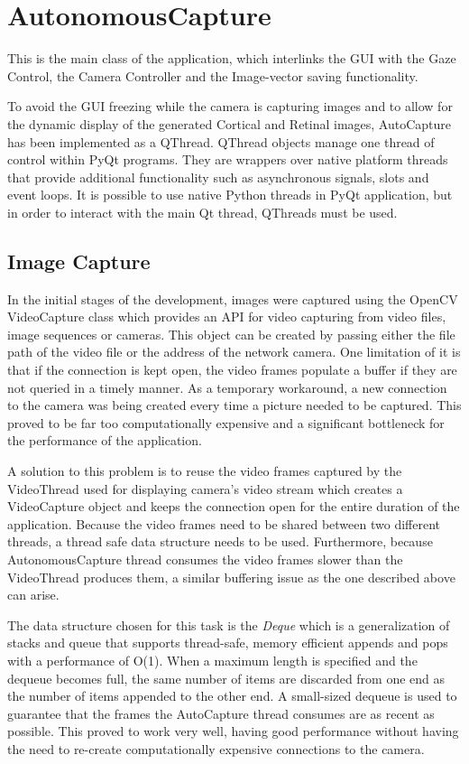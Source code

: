 \documentclass{l4proj}
\begin{document}
\section{AutonomousCapture}

This is the main class of the application, which interlinks the GUI with the Gaze Control, the Camera Controller and the Image-vector saving functionality. 


To avoid the GUI freezing while the camera is capturing images and to allow for the dynamic display of the generated Cortical and Retinal images, AutoCapture has been implemented as a QThread. QThread objects manage one thread of control within PyQt programs. They are wrappers over native platform threads that provide additional functionality such as asynchronous signals, slots and event loops. It is possible to use native Python threads in PyQt application, but in order to interact with the main Qt thread, QThreads must be used.

\subsection{Image Capture}

In the initial stages of the development, images were captured using the OpenCV VideoCapture class which provides an API for video capturing from video files, image sequences or cameras. This object can be created by passing either the file path of the video file or the address of the network camera. One limitation of it is that if the connection is kept open, the video frames populate a buffer if they are not queried in a timely manner. As a temporary workaround, a new connection to the camera was being created every time a picture needed to be captured. This proved to be far too computationally expensive and a significant bottleneck for the performance of the application. 

A solution to this problem is to reuse the video frames captured by the VideoThread used for displaying camera's video stream which creates a VideoCapture object and keeps the connection open for the entire duration of the application. Because the video frames need to be shared between two different threads, a thread safe data structure needs to be used. Furthermore, because AutonomousCapture thread consumes the video frames slower than the VideoThread produces them, a similar buffering issue as the one described above can arise. 

The data structure chosen for this task is the \textit{Deque} which is a generalization of stacks and queue that supports thread-safe, memory efficient appends and pops with a performance of O(1). When a maximum length is specified and the dequeue becomes full, the same number of items are discarded from one end as the number of items appended to the other end. A small-sized dequeue is used to guarantee that the frames the AutoCapture thread consumes are as recent as possible. This proved to work very well, having good performance without having the need to re-create computationally expensive connections to the camera. 
\end{document}
